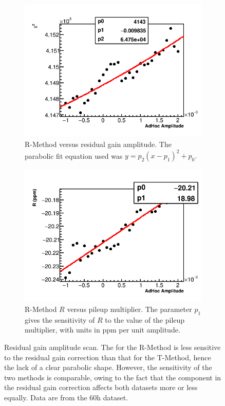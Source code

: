 \begin{figure}[h]
    \begin{subfigure}[t]{0.45\textwidth}
        \centering
        \includegraphics[width=\textwidth]{FullRatio_Chi2_Vs_AdHocAmplitude_Canv}
        \caption{R-Method \chisq versus residual gain amplitude. The parabolic fit equation used was $y = p_{2}(x - p_{1})^{2} + p_{0}.$}
    \end{subfigure}%
    \hspace{1cm}
    \begin{subfigure}[t]{0.45\textwidth}
        \centering
        \includegraphics[width=\textwidth]{FullRatio_R_Vs_AdHocAmplitude_Canv}
        \caption{R-Method $R$ versus pileup multiplier. The parameter $p_{1}$ gives the sensitivity of $R$ to the value of the pileup multiplier, with units in ppm per unit amplitude.}
    \end{subfigure}
\caption[]{Residual gain amplitude scan. The \chisq for the R-Method is less sensitive to the residual gain correction than that for the T-Method, hence the lack of a clear parabolic shape. However, the sensitivity of the two methods is comparable, owing to the fact that the \wa component in the residual gain correction affects both datasets more or less equally. Data are from the 60h dataset.}
\label{fig:AdHocGainScan}
\end{figure}



